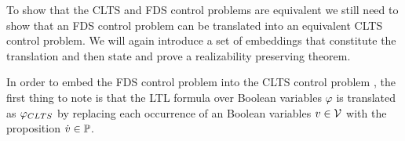 
To show that the CLTS and FDS control problems are equivalent we  still need to show that an FDS control problem can be translated into an equivalent CLTS control problem. We will again introduce a set of embeddings that constitute the translation and then state and prove a realizability preserving theorem.

In order to embed the FDS control problem \fdsControlProblemDef into the CLTS control problem \cltsCPEmbeddingDef, the first thing to note is that the LTL formula over Boolean variables $\varphi$ is translated as $\varphi_{CLTS}$ by replacing each occurrence of an Boolean variables $v \in {\ensuremath{\mathcal{V}}}$ with the proposition $\dot{v} \in \mathbb{P}$. 
%	

